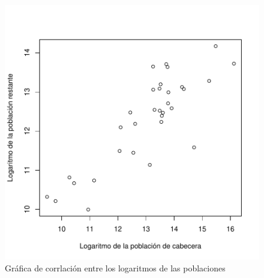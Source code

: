 \documentclass{article}
\begin{document}
\begin{figure}[h]
\centering 
\begin{adjustbox}{width=8cm,height=7cm,clip,trim=0cm 0cm 0cm 0cm}
\includegraphics{ProyectoFinal-CorrPlotExpBivariada}
\end{adjustbox}
\caption{Gráfica de corrlación entre los logaritmos de las poblaciones}
\label{corrPlot}
\end{figure}

\clearpage
\end{document}

